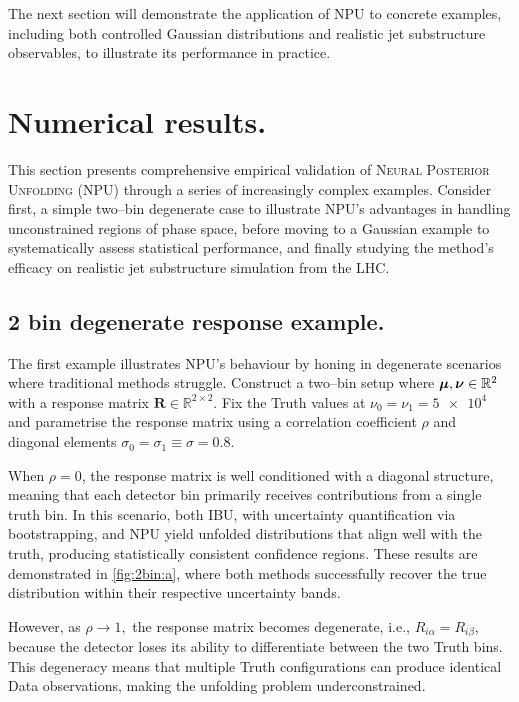     The next section will demonstrate the application of NPU to concrete examples, including both controlled Gaussian distributions and realistic jet substructure observables, to illustrate its performance in practice.
    
\section{Numerical results.}
\sectionminitoc
    This section presents comprehensive empirical validation of \textsc{Neural Posterior Unfolding} (NPU) through a series of increasingly complex examples.
     Consider first, a simple two--bin degenerate case to illustrate NPU's advantages in handling unconstrained regions of phase space, before moving to a Gaussian example to systematically assess statistical performance, and finally studying the method's efficacy on realistic jet substructure simulation from the LHC.
     
    \subsection{2 bin degenerate response example.}
    
        The first example illustrates NPU's behaviour by honing in degenerate scenarios where traditional methods struggle.
         Construct a two--bin setup where $\vb*{\mu}, \vb*\nu \in \mathbb{R}^2$ with a response matrix $\mathbf{R} \in \mathbb{R}^{2 \times 2}$.
        Fix the Truth values at $\nu_0 = \nu_1 = \num{5e4}$ and parametrise the response matrix using a correlation coefficient $\rho$ and diagonal elements $\sigma_0 = \sigma_1 \equiv \sigma = 0.8$.

When $\rho = 0$, the response matrix is well conditioned with a diagonal structure, meaning that each detector bin primarily receives contributions from a single truth bin.
%
In this scenario, both IBU, with uncertainty quantification via bootstrapping, and NPU yield unfolded distributions that align well with the truth, producing statistically consistent confidence regions.
%
These results are demonstrated in \cref{fig:2bin:a}, where both methods successfully recover the true distribution within their respective uncertainty bands.

However, as \(\rho\to1,\) the response matrix becomes degenerate, i.e., $R_{i\alpha} = R_{i\beta}$, because the detector loses its ability to differentiate between the two Truth bins.
%
This degeneracy means that multiple Truth configurations can produce identical Data observations, making the unfolding problem underconstrained.

